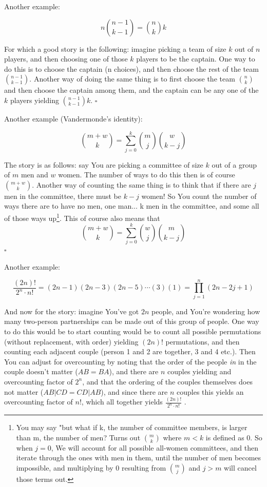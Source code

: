 \documentclass{article}
\begin{document}
		Another example:
		
		 $$n {n-1 \choose k-1} = {n \choose k} k$$
		 
		 For which a good story is the following: imagine picking a team of size $k$ out of $n$ players, and then choosing one of those $k$ players to be the captain. One way to do this is to choose the captain (n choices), and then choose the rest of the team ${ n-1 \choose k-1}$. Another way of doing the same thing is to first choose the team ${ n \choose k}$ and then choose the captain among them, and the captain can be any one of the $k$ players yielding ${ n-1 \choose k-1}k$. \hfill $\square$
		 
		 Another example (Vandermonde's identity):
		 
		 $${m + w \choose k} = \sum_{j=0}^k {m \choose j}{ w \choose k-j}$$
		
		The story is as follows: say You are picking a committee of size $k$ out of a group of $m$ men and $w$ women. The number of ways to do this then is of course ${m + w \choose k}$. Another way of counting the same thing is to think that if there are $j$ men in the committee, there must be $k-j$ women! So You count the number of ways there are to have no men, one man... k men in the committee, and some all of those ways up\footnote{You may say "but what if k, the number of committee members, is larger than m, the number of men? Turns out ${m \choose k}$ where $m < k$ is defined as 0. So when $j=0$, We will account for all possible all-women committees, and then iterate through the ones with men in them, until the number of men becomes impossible, and multiplying by 0 resulting from ${m \choose j}$ and $j > m$ will cancel those terms out.}. This of course also means that $${m + w \choose k} = \sum_{j=0}^k {w \choose j}{ m \choose k-j}$$
		\hfill $\square$
		
		Another example: 
		
		$$\frac{(2n)!}{2^n\cdot n!} = (2n-1)(2n-3)(2n-5)\cdots(3)(1) = \prod^n_{j=1} (2n -2j + 1)$$
		
		And now for the story: imagine You've got $2n$ people, and You're wondering how many two-person partnerships can be made out of this group of people. One way to do this would be to start counting would be to count all possible permutations (without replacement, with order) yielding $(2n)!$ permutations, and then counting each adjacent couple (person 1 and 2 are together, 3 and 4 etc.). Then You can adjust for overcounting by noting that the order of the people \textit{in} in the couple doesn't matter ($AB = BA$), and there are $n$ couples yielding and overcounting factor of $2^n$, and that the ordering of the couples themselves does not matter ($AB\vert CD = CD\vert AB$), and since there are $n$ couples this yields an overcounting factor of $n!$, which all together yields $\frac{(2n)!}{2^n\cdot n!}$ . 
		
\end{document}
